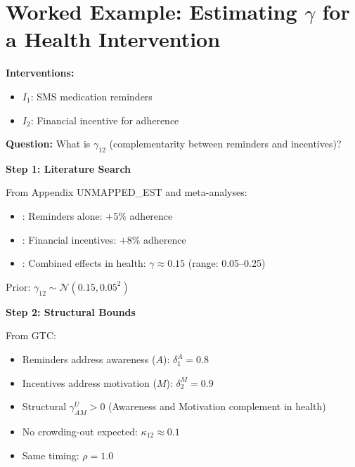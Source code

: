 \section{Worked Example: Estimating $\gamma$ for a Health Intervention}
\label{sec:worked-example}

\begin{tcolorbox}[colback=blue!5!white,colframe=blue!75!black,title=\textbf{Case: MediCare Medication Adherence Program}]
\textbf{Interventions:}
\begin{itemize}[noitemsep]
    \item $I_1$: SMS medication reminders
    \item $I_2$: Financial incentive for adherence
\end{itemize}

\textbf{Question:} What is $\gamma_{12}$ (complementarity between reminders and incentives)?
\end{tcolorbox}

\textbf{Step 1: Literature Search}

From Appendix UNMAPPED_EST and meta-analyses:
\begin{itemize}
    \item \citet{karlan2011}: Reminders alone: $+5\%$ adherence
    \item \citet{thaler2004}: Financial incentives: $+8\%$ adherence
    \item \citet{volpp2008}: Combined effects in health: $\gamma \approx 0.15$ (range: 0.05–0.25)
\end{itemize}

Prior: $\gamma_{12} \sim \mathcal{N}(0.15, 0.05^2)$

\textbf{Step 2: Structural Bounds}

From GTC:
\begin{itemize}
    \item Reminders address awareness ($A$): $\delta_1^A = 0.8$
    \item Incentives address motivation ($M$): $\delta_2^M = 0.9$
    \item Structural $\gamma^U_{AM} > 0$ (Awareness and Motivation complement in health)
    \item No crowding-out expected: $\kappa_{12} \approx 0.1$
    \item Same timing: $\rho = 1.0$
\end{itemize}

